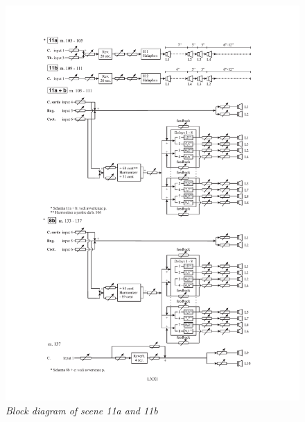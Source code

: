 \documentclass[twoside,a4paper]{article}
\begin{document}
%
%

\begin{figure}[ht]
\centerline{\includegraphics[width=.45\textwidth]{img/re-diagramma11}}
\caption{\label{re-dia-6c}{\it Block diagram of scene 11a and 11b}}
\end{figure}
\end{document}
